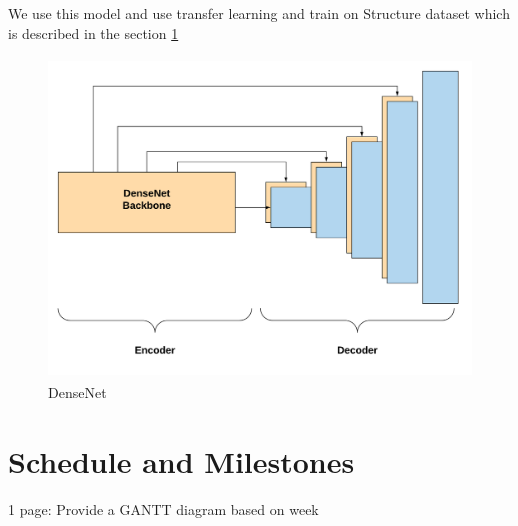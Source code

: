 We use this model and use transfer learning and train on Structure dataset which is described in the section \ref{}

\begin{figure}[h]
    \centering
    \includegraphics[width = 14cm,  height = 8.5cm]{Figures/A2.png}
    \caption{DenseNet}
    \label{fig:A2-DenseNet-arch}
\end{figure}{}







\section{Schedule and Milestones}
1 page: Provide a GANTT diagram based on week
